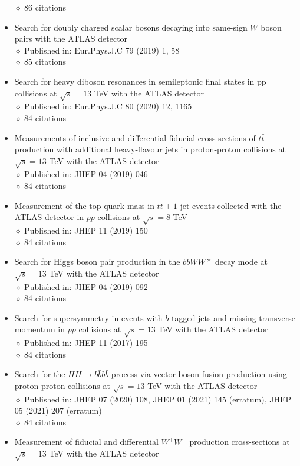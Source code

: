 \documentclass[margin, 10pt]{res} %
\begin{document}
\begin{resume}
\begin{itemize}
$\diamond$ 86 citations
\item Search for doubly charged scalar bosons decaying into same-sign $W$ boson pairs with the ATLAS detector\\
$\diamond$ Published in: Eur.Phys.J.C 79 (2019) 1, 58\\
$\diamond$ 85 citations
\item Search for heavy diboson resonances in semileptonic final states in pp collisions at $\sqrt{s} = 13$ TeV with the ATLAS detector\\
$\diamond$ Published in: Eur.Phys.J.C 80 (2020) 12, 1165\\
$\diamond$ 84 citations
\item Measurements of inclusive and differential fiducial cross-sections of $t\bar{t}$ production with additional heavy-flavour jets in proton-proton collisions at $\sqrt{s} = 13$ TeV with the ATLAS detector\\
$\diamond$ Published in: JHEP 04 (2019) 046\\
$\diamond$ 84 citations
\item Measurement of the top-quark mass in $t\bar{t} + 1$-jet events collected with the ATLAS detector in $pp$ collisions at $\sqrt{s} = 8$ TeV\\
$\diamond$ Published in: JHEP 11 (2019) 150\\
$\diamond$ 84 citations
\item Search for Higgs boson pair production in the $b\bar{b}WW{*}$ decay mode at $\sqrt{s} = 13$ TeV with the ATLAS detector\\
$\diamond$ Published in: JHEP 04 (2019) 092\\
$\diamond$ 84 citations
\item Search for supersymmetry in events with $b$-tagged jets and missing transverse momentum in $pp$ collisions at $\sqrt{s} = 13$ TeV with the ATLAS detector\\
$\diamond$ Published in: JHEP 11 (2017) 195\\
$\diamond$ 84 citations
\item Search for the $HH \rightarrow b\bar{b}b\bar{b}$ process via vector-boson fusion production using proton-proton collisions at $\sqrt{s} = 13$ TeV with the ATLAS detector\\
$\diamond$ Published in: JHEP 07 (2020) 108, JHEP 01 (2021) 145 (erratum), JHEP 05 (2021) 207 (erratum)\\
$\diamond$ 84 citations
\item Measurement of fiducial and differential $W^{+}W^{-}$ production cross-sections at $\sqrt{s} = 13$ TeV with the ATLAS detector\\

\end{itemize}
\end{resume}
\end{document}
